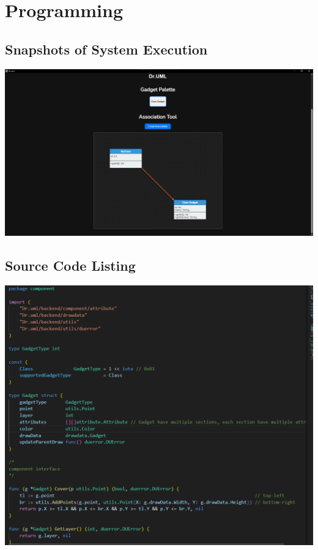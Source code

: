 \documentclass[12pt]{article}
\begin{document}
    \section{Programming}

    \subsection{Snapshots of System Execution}
    \begin{center}
        \includegraphics[width=0.95\linewidth]
        {assets/hw5/snapshots_of_system_execution}
    \end{center}

    \subsection{Source Code Listing}
    \includegraphics[width=0.95\linewidth]
    {assets/hw5/snapshot_gadget_code}
\end{document}

